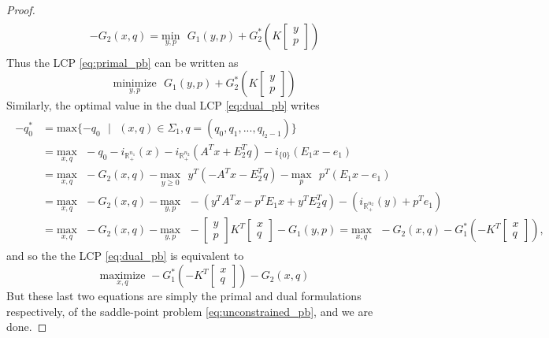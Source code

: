 \documentclass{article} %
\begin{document}
\begin{proof}
\begin{eqnarray*}
\begin{aligned}
      - G_2(x, q) = \underset{y,p}{\text{min}}\text{ }G_1(y,p) +
      G_2^*\left(K\begin{bmatrix}y\\p\end{bmatrix}\right)
  \end{aligned}
  \label{eq:a}
\end{eqnarray*}
Thus the LCP \eqref{eq:primal_pb} can be written as 
\begin{equation}
  \underset{y,p}{\text{minimize}}\text{ }G_1(y,p) +
  G_2^*\left(K\begin{bmatrix}y\\p\end{bmatrix}\right)
\end{equation}
Similarly, the optimal value in the dual LCP \eqref{eq:dual_pb} writes
\begin{eqnarray*}
  \begin{aligned}
 -q_0^* &= \text{max}\{-q_0\text{ }|\text{ } (x, q) \in \Sigma_1, q =
 (q_0, q_1, ..., q_{l_2-1})\}\\
    &= \underset{x,q}{\text{max}}\text{ }-q_0 -
 i_{\mathbb{R}^{n_1}_+}(x) - i_{\mathbb{R}^{n_2}_+}(A^Tx+E_2^Tq) -
 i_{\{0\}}(E_1x - e_1)\\
    &= \underset{x,q}{\text{max}}\text{ }-G_2(x, q) - \underset{y \geq
   0}{\text{max}}\text{ }y^T(-A^Tx - E_2^Tq) -
 \underset{p}{\text{max}}\text{ }p^T(E_1x-e_1)\\
    &= \underset{x,q}{\text{max}}\text{ }-G_2(x, q)
 -\underset{y,p}{\text{max}}\text{ }-(y^TA^Tx -p^TE_1x +
 y^TE_2^Tq)-(i_{\mathbb{R}^{n_2}_+}(y) + p^Te_1)\\
    &= \underset{x,q}{\text{max}}\text{ }-G_2(x,
 q)-\underset{y,p}{\text{max}}\text{ }-
 \begin{bmatrix}y\\p\end{bmatrix}K^T\begin{bmatrix}x\\q\end{bmatrix}-G_1(y,p)
   = \underset{x,q}{\text{max}}\text{ }-G_2(x,
   q)-G_1^*\left(-K^T\begin{bmatrix}x\\q\end{bmatrix}\right),
  \end{aligned}
\end{eqnarray*}
and so the the LCP \eqref{eq:dual_pb} is equivalent to
\begin{equation}
  \underset{x,q}{\text{maximize}}\text{
  }-G_1^*\left(-K^T\begin{bmatrix}x\\q\end{bmatrix}\right) - G_2(x, q)
\end{equation}
But these last two equations are simply the primal and dual
formulations respectively, of the saddle-point problem
\eqref{eq:unconstrained_pb}, and we are done.


\end{proof}
\end{document}
